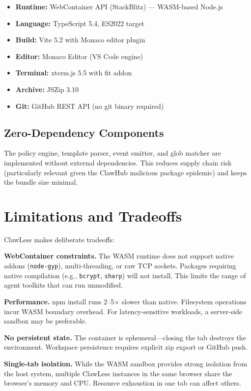 \documentclass[11pt,twocolumn]{article}
\begin{document}
\begin{itemize}[noitemsep]
  \item \textbf{Runtime:} WebContainer API (StackBlitz) --- WASM-based Node.js
  \item \textbf{Language:} TypeScript 5.4, ES2022 target
  \item \textbf{Build:} Vite 5.2 with Monaco editor plugin
  \item \textbf{Editor:} Monaco Editor (VS Code engine)
  \item \textbf{Terminal:} xterm.js 5.5 with fit addon
  \item \textbf{Archive:} JSZip 3.10
  \item \textbf{Git:} GitHub REST API (no git binary required)
\end{itemize}

\subsection{Zero-Dependency Components}

The policy engine, template parser, event emitter, and glob matcher are implemented without external dependencies. This reduces supply chain risk (particularly relevant given the ClawHub malicious package epidemic) and keeps the bundle size minimal.

\section{Limitations and Tradeoffs}
\label{sec:limitations}

ClawLess makes deliberate tradeoffs:

\textbf{WebContainer constraints.} The WASM runtime does not support native addons (\texttt{node-gyp}), multi-threading, or raw TCP sockets. Packages requiring native compilation (e.g., \texttt{bcrypt}, \texttt{sharp}) will not install. This limits the range of agent toolkits that can run unmodified.

\textbf{Performance.} npm install runs 2--5$\times$ slower than native. Filesystem operations incur WASM boundary overhead. For latency-sensitive workloads, a server-side sandbox may be preferable.

\textbf{No persistent state.} The container is ephemeral---closing the tab destroys the environment. Workspace persistence requires explicit zip export or GitHub push.

\textbf{Single-tab isolation.} While the WASM sandbox provides strong isolation from the host system, multiple ClawLess instances in the same browser share the browser's memory and CPU. Resource exhaustion in one tab can affect others.
\end{document}
